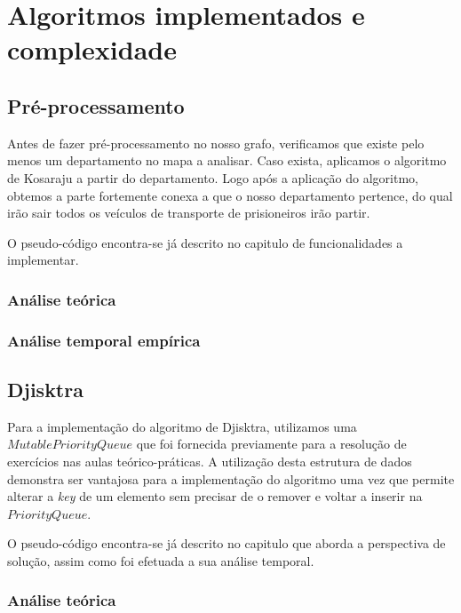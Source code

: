 \documentclass[article, a4paper, 12pt, oneside]{memoir}
\begin{document}
\newpage
\chapter[Algoritmos implementados e complexidade][Algoritmos implementados e complexidade]{Algoritmos implementados e complexidade} \label{\thechapter}

\section{Pré-processamento}
Antes de fazer pré-processamento no nosso grafo, verificamos que existe pelo menos um departamento no mapa a analisar.
Caso exista, aplicamos o algoritmo de Kosaraju a partir do departamento. Logo após a aplicação do algoritmo, 
obtemos a parte fortemente conexa a que o nosso departamento pertence, do qual irão sair todos os veículos de transporte de prisioneiros irão partir.

O pseudo-código encontra-se já descrito no capitulo de funcionalidades a implementar.
\subsection{Análise teórica}
\subsection{Análise temporal empírica}

\section{Djisktra}
Para a implementação do algoritmo de Djisktra, utilizamos uma $MutablePriorityQueue$ que foi fornecida previamente para a resolução de exercícios nas aulas teórico-práticas.
A utilização desta estrutura de dados demonstra ser vantajosa para a implementação do algoritmo uma vez que permite
alterar a \textit{key} de um elemento sem precisar de o remover e voltar a inserir na $PriorityQueue$.

O pseudo-código encontra-se já descrito no capitulo que aborda a perspectiva de solução, assim como foi efetuada a sua análise temporal.
\subsection{Análise teórica}
\end{document}

